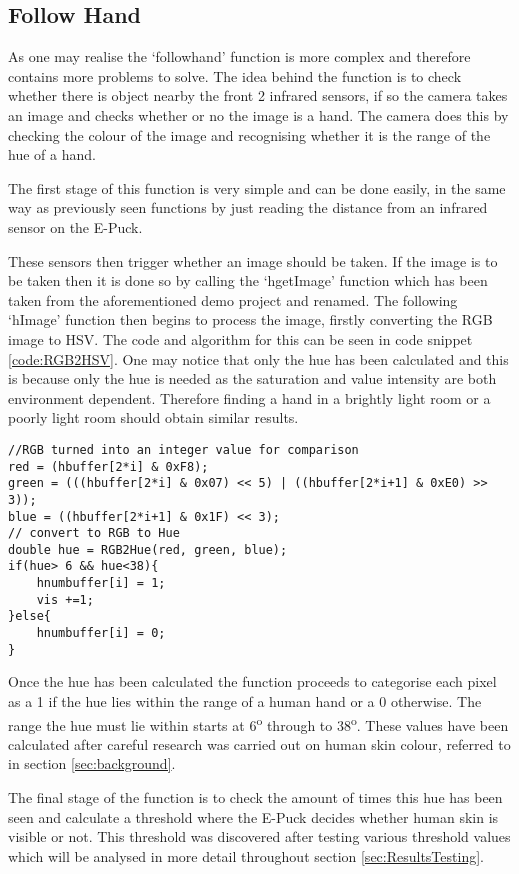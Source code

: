 \subsection{Follow Hand}

As one may realise the `followhand' function is more complex and therefore contains more problems to solve. The idea behind the function is to check whether there is object nearby the front 2 infrared sensors, if so the camera takes an image and checks whether or no the image is a hand. The camera does this by checking the colour of the image and recognising whether it is the range of the hue of a hand.

The first stage of this function is very simple and can be done easily, in the same way as previously seen functions by just reading the distance from an infrared sensor on the E-Puck.

These sensors then trigger whether an image should be taken. If the image is to be taken then it is done so by calling the `hgetImage' function which has been taken from the aforementioned demo project and renamed. The following `hImage' function then begins to process the image, firstly converting the RGB image to HSV. The code and algorithm for this can be seen in code snippet \ref{code:RGB2HSV}. One may notice that only the hue has been calculated and this is because only the hue is needed as the saturation and value intensity are both environment dependent. Therefore finding a hand in a brightly light room or a poorly light room should obtain similar results.

\vspace{5mm}
\begin{lstlisting}[caption={Converting RGB pixels to HSV},label=code:RGB2HSV]
//RGB turned into an integer value for comparison
red = (hbuffer[2*i] & 0xF8);
green = (((hbuffer[2*i] & 0x07) << 5) | ((hbuffer[2*i+1] & 0xE0) >> 3));
blue = ((hbuffer[2*i+1] & 0x1F) << 3);
// convert to RGB to Hue
double hue = RGB2Hue(red, green, blue);
if(hue> 6 && hue<38){
	hnumbuffer[i] = 1;
	vis +=1;
}else{
	hnumbuffer[i] = 0;
}
\end{lstlisting}

Once the hue has been calculated the function proceeds to categorise each pixel as a 1 if the hue lies within the range of a human hand or a 0 otherwise. The range the hue must lie within starts at 6\textsuperscript{o} through to 38\textsuperscript{o}. These values have been calculated after careful research was carried out on human skin colour, referred to in section \ref{sec:background}.

The final stage of the function is to check the amount of times this hue has been seen and calculate a threshold where the E-Puck decides whether human skin is visible or not. This threshold was discovered after testing various threshold values which will be analysed in more detail throughout section \ref{sec:ResultsTesting}. 